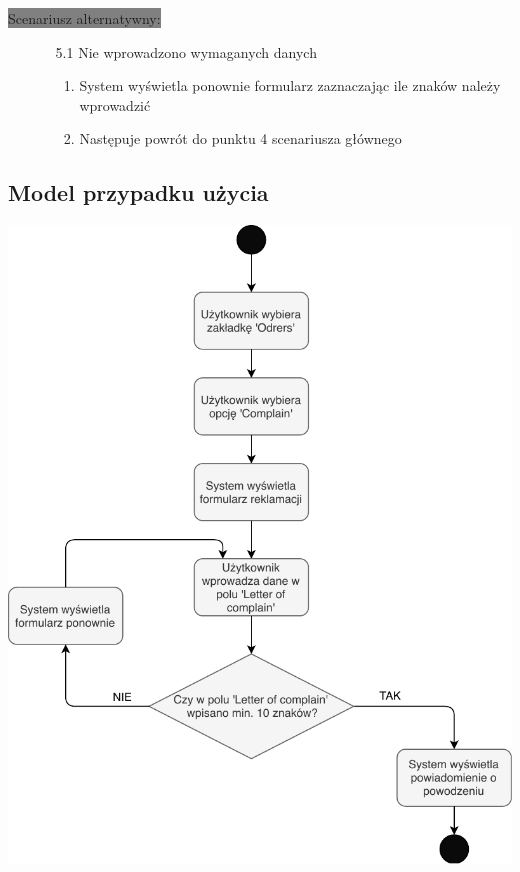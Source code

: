 \documentclass[12pt]{report}
\begin{document}
			\colorbox{grey}{Scenariusz alternatywny:}
			\begin{enumerate}\addtocounter{enumi}{2}
				\item[]
				\begin{enumerate}
					\item[5.1] Nie wprowadzono wymaganych danych
					\begin{enumerate}
						\item System wyświetla ponownie formularz zaznaczając ile znaków należy wprowadzić
						\item Następuje powrót do punktu 4 scenariusza głównego
					\end{enumerate}
				\end{enumerate}
			\end{enumerate}
			\newpage
			
		\subsection{Model przypadku użycia}
			\begin{center}
				\includegraphics[width=400pt]{reklamacja.pdf}
			\end{center}
			\newpage
			
\end{document}
